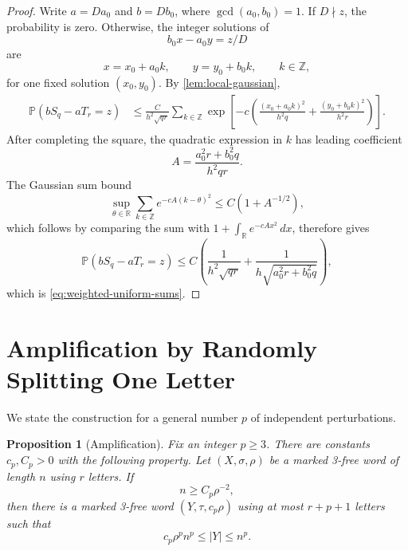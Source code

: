 \documentclass[11pt]{article}
\theoremstyle{plain}
\newtheorem{proposition}{Proposition}[section]
\theoremstyle{definition}
\theoremstyle{remark}
\newcommand{\Z}{\mathbb Z}
\newcommand{\Prob}{\mathbb P}
\begin{document}
\begin{proof}
Write $a=Da_0$ and $b=Db_0$, where $\gcd(a_0,b_0)=1$. If $D\nmid z$, the probability is zero. Otherwise, the integer solutions of
\[
        b_0x-a_0y=z/D
\]
are
\[
        x=x_0+a_0k,
        \qquad
        y=y_0+b_0k,
        \qquad k\in\Z,
\]
for one fixed solution $(x_0,y_0)$. By \cref{lem:local-gaussian},
\begin{align*}
 \Prob(bS_q-aT_r=z)
 &\le \frac{C}{h^2\sqrt{qr}}
 \sum_{k\in\Z}
 \exp\left[-c\left(
   \frac{(x_0+a_0k)^2}{h^2q}
   +\frac{(y_0+b_0k)^2}{h^2r}
 \right)\right].
\end{align*}
After completing the square, the quadratic expression in $k$ has leading coefficient
\[
        A=\frac{a_0^2r+b_0^2q}{h^2qr}.
\]
The Gaussian sum bound
\[
        \sup_{\theta\in\mathbb R}
        \sum_{k\in\Z}e^{-cA(k-\theta)^2}
        \le C(1+A^{-1/2}),
\]
which follows by comparing the sum with \(1+\int_{\mathbb R}e^{-cAx^2}\,dx\), therefore gives
\[
 \Prob(bS_q-aT_r=z)
 \le C\left(
        \frac{1}{h^2\sqrt{qr}}
        +\frac{1}{h\sqrt{a_0^2r+b_0^2q}}
 \right),
\]
which is \eqref{eq:weighted-uniform-sums}.
\end{proof}

\section{Amplification by Randomly Splitting One Letter}\label{sec:amplification}

We state the construction for a general number \(p\) of independent perturbations.

\begin{proposition}[Amplification]\label{prop:amplification}
Fix an integer $p\ge3$. There are constants $c_p,C_p>0$ with the following property. Let $(X,\sigma,\rho)$ be a marked 3-free word of length $n$ using \(r\) letters. If
\begin{equation}\label{eq:amplifier-size-hypothesis}
        n\ge C_p\rho^{-2},
\end{equation}
then there is a marked 3-free word \((Y,\tau,c_p\rho)\) using at most \(r+p+1\) letters such that
\begin{equation}\label{eq:amplifier-conclusion}
        c_p\rho^p n^p\le |Y|\le n^p.
\end{equation}
\end{proposition}
\end{document}
